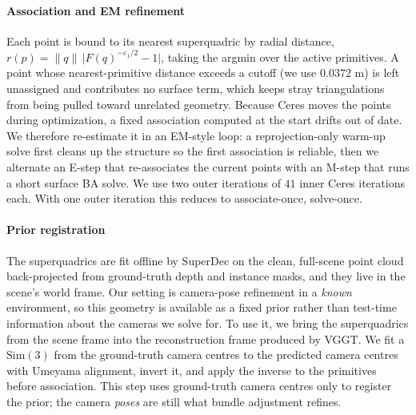 \paragraph{Association and EM refinement}
Each point is bound to its nearest superquadric by radial distance, $r(p) = \lVert q \rVert \, \lvert F(q)^{-\varepsilon_1/2} - 1 \rvert$, taking the argmin over the active primitives. A point whose nearest-primitive distance exceeds a cutoff (we use $0.0372$ m) is left unassigned and contributes no surface term, which keeps stray triangulations from being pulled toward unrelated geometry. Because Ceres moves the points during optimization, a fixed association computed at the start drifts out of date. We therefore re-estimate it in an EM-style loop: a reprojection-only warm-up solve first cleans up the structure so the first association is reliable, then we alternate an E-step that re-associates the current points with an M-step that runs a short surface BA solve. We use two outer iterations of $41$ inner Ceres iterations each. With one outer iteration this reduces to associate-once, solve-once.

\paragraph{Prior registration}
The superquadrics are fit offline by SuperDec \cite{fedele2026superdec3dscenedecomposition} on the clean, full-scene point cloud back-projected from ground-truth depth and instance masks, and they live in the scene's world frame. Our setting is camera-pose refinement in a \emph{known} environment, so this geometry is available as a fixed prior rather than test-time information about the cameras we solve for. To use it, we bring the superquadrics from the scene frame into the reconstruction frame produced by VGGT. We fit a $\mathrm{Sim}(3)$ from the ground-truth camera centres to the predicted camera centres with Umeyama alignment, invert it, and apply the inverse to the primitives before association. This step uses ground-truth camera centres only to register the prior; the camera \emph{poses} are still what bundle adjustment refines.
